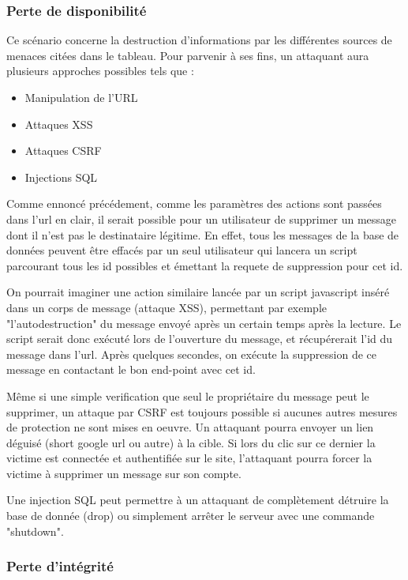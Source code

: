 \documentclass[12pt]{article}
\begin{document}
\subsubsection{Perte de disponibilité} \label{2}

Ce scénario concerne la destruction d'informations par les différentes sources de menaces citées dans le tableau. Pour parvenir à ses fins, un attaquant aura plusieurs approches possibles tels que : 

\begin{itemize}
\item Manipulation de l'URL
\item Attaques XSS
\item Attaques CSRF
\item Injections SQL
\end{itemize}

Comme ennoncé précédement, comme les paramètres des actions sont passées dans l'url en clair, il serait possible pour un utilisateur de supprimer un message dont il n'est pas le destinataire légitime. En effet, tous les messages de la base de données peuvent être effacés par un seul utilisateur qui lancera un script parcourant tous les id possibles et émettant la requete de suppression pour cet id.

On pourrait imaginer une action similaire lancée par un script javascript inséré dans un corps de message (attaque XSS), permettant par exemple "l'autodestruction" du message envoyé après un certain temps après la lecture. Le script serait donc exécuté lors de l'ouverture du message, et récupérerait l'id du message dans l'url. Après quelques secondes, on exécute la suppression de ce message en contactant le bon end-point avec cet id.

Même si une simple verification que seul le propriétaire du message peut le supprimer, un attaque par CSRF est toujours possible si aucunes autres mesures de protection ne sont mises en oeuvre. Un attaquant pourra envoyer un lien déguisé (short google url ou autre) à la cible. Si lors du clic sur ce dernier la victime est connectée et authentifiée sur le site, l'attaquant pourra forcer la victime à supprimer un message sur son compte.

Une injection SQL peut permettre à un attaquant de complètement détruire la base de donnée (drop) ou simplement arrêter le serveur avec une commande "shutdown".

\subsubsection{Perte d'intégrité} \label{3}
\end{document}
